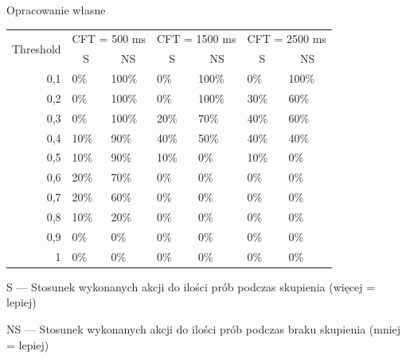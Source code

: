 \documentclass[skorowidz,skroty]{dyplomWEZUT}
\begin{document}
{Opracowanie własne}
{
    \begin{threeparttable}
        \begin{tabularx}{.95\linewidth}{r|X|X|X|X|X|X}
            \multirow{2}{*}{Threshold} & \multicolumn{2}{c|}{CFT = 500 ms} & \multicolumn{2}{c|}{CFT = 1500 ms} & \multicolumn{2}{c}{CFT = 2500 ms} \\ \cline{2-7} 
            \multicolumn{1}{c|}{} & \multicolumn{1}{c|}{S} & \multicolumn{1}{c|}{NS} & \multicolumn{1}{c|}{S} & \multicolumn{1}{c|}{NS} & \multicolumn{1}{c|}{S} & \multicolumn{1}{c}{NS} \\ \hline\hline
            0,1 & 0\% & 100\% & 0\% & 100\% & 0\% & 100\% \\ \hline
            0,2 & 0\% & 100\% & 0\% & 100\% & 30\% & 60\% \\ \hline
            0,3 & 0\% & 100\% & 20\% & 70\% & 40\% & 60\% \\ \hline
            0,4 & 10\% & 90\% & 40\% & 50\% & 40\% & 40\% \\ \hline
            0,5 & 10\% & 90\% & 10\% & 0\% & 10\% & 0\% \\ \hline
            0,6 & 20\% & 70\% & 0\% & 0\% & 0\% & 0\% \\ \hline
            0,7 & 20\% & 60\% & 0\% & 0\% & 0\% & 0\% \\ \hline
            0,8 & 10\% & 20\% & 0\% & 0\% & 0\% & 0\% \\ \hline
            0,9 & 0\% & 0\% & 0\% & 0\% & 0\% & 0\% \\ \hline
            1 & 0\% & 0\% & 0\% & 0\% & 0\% & 0\% \\
        \end{tabularx}
        \begin{tablenotes}
            \item \hphantom{N}S --- Stosunek wykonanych akcji do ilości prób podczas skupienia (więcej = lepiej)
            \item NS --- Stosunek wykonanych akcji do ilości prób podczas braku skupienia (mniej = lepiej)
        \end{tablenotes}
    \end{threeparttable}
}
\end{document}
